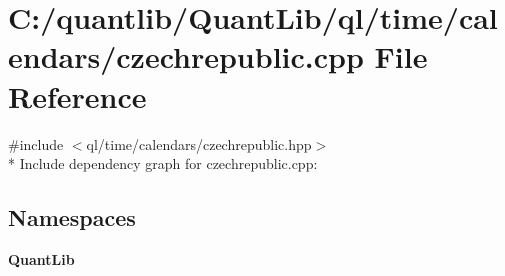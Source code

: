 \section{C\+:/quantlib/\+Quant\+Lib/ql/time/calendars/czechrepublic.cpp File Reference}
\label{czechrepublic_8cpp}
{\ttfamily \#include $<$ql/time/calendars/czechrepublic.\+hpp$>$}\\*
Include dependency graph for czechrepublic.\+cpp\+:
\subsection*{Namespaces}
\begin{DoxyCompactItemize}
\item 
 {\bf Quant\+Lib}
\end{DoxyCompactItemize}
